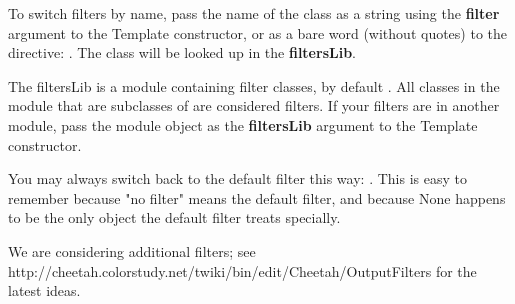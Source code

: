 To switch filters by name, pass the name of the class as a string using the
{\bf filter} argument to the Template constructor, or as a bare word (without
quotes) to the  directive: .  The
class will be looked up in the {\bf filtersLib}.

The filtersLib is a module containing filter classes, by default
.  All classes in the module that are subclasses of
 are considered filters.  If your filters are in
another module, pass the module object as the {\bf filtersLib} argument to the
Template constructor.

You may always switch back to the default filter this way:
.  This is easy to remember because "no filter" means the
default filter, and because None happens to be the only object the default
filter treats specially.

We are considering additional filters; see
http://cheetah.colorstudy.net/twiki/bin/edit/Cheetah/OutputFilters
for the latest ideas.




